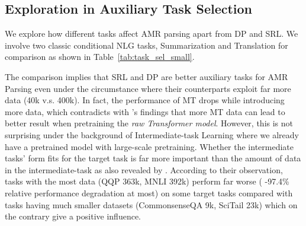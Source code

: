 \documentclass[11pt]{article}
\begin{document}
\subsection{Exploration in Auxiliary Task Selection} 

\begin{table}[t]
    \centering
    \caption{Result of Task Selection. We first train BART on different auxiliary tasks for 10 epochs before AMR Parsing. We also report the average scores of Concept-related (Conc.) and Topology-related metrics (Topo.) }
    \label{tab:task_sel_small}
\end{table}
 


We explore how different tasks affect AMR parsing apart from DP and SRL. We involve two classic conditional NLG tasks, Summarization and Translation for comparison as shown in Table~\ref{tab:task_sel_small}. 

The comparison implies that SRL and DP are better auxiliary tasks for AMR Parsing even under the circumstance where their counterparts exploit far more data (40k v.s. 400k). In fact, the performance of MT drops while introducing more data, which contradicts with \citet{xu-seqpretrain} 's findings that more MT data can lead to better result when pretraining the \textit{raw Transformer model}. However, this is not surprising under the background of Intermediate-task Learning where we already have a pretrained model with large-scale pretraining. Whether the intermediate tasks' form fits for the target task is far more important than the amount of data in the intermediate-task as also revealed by \citet{poth2021intermediate}. According to their observation, tasks with the most data (QQP 363k, MNLI 392k) perform far worse ( -97.4\% relative performance degradation at most) on some target tasks compared with tasks having much smaller datasets (CommonsenseQA 9k, SciTail 23k) which on the contrary give a positive influence. 
\end{document}
